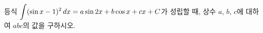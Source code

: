 등식 $\displaystyle\int(\sin x-1)^2\mkern3mu dx=a\sin 2x+b\cos x+cx+C$가 성립할 때, 상수 $a$, $b$, $c$에 대하여 $abc$의 값을 구하시오. 
